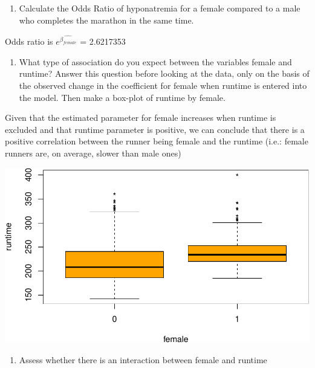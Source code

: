 \documentclass[]{article}
\begin{document}
\begin{enumerate}
\def\labelenumi{\alph{enumi}.}
\setcounter{enumi}{7}
\itemsep1pt\parskip0pt
\item
  Calculate the Odds Ratio of hyponatremia for a female compared to a
  male who completes the marathon in the same time.
\end{enumerate}

Odds ratio is $e^{\hat{\beta_{female}}}$ = 2.6217353

\begin{enumerate}
\def\labelenumi{\roman{enumi}.}
\itemsep1pt\parskip0pt
\item
  What type of association do you expect between the variables female
  and runtime? Answer this question before looking at the data, only on
  the basis of the observed change in the coefficient for female when
  runtime is entered into the model. Then make a box-plot of runtime by
  female.
\end{enumerate}

Given that the estimated parameter for female increases when runtime is
excluded and that runtime parameter is positive, we can conclude that
there is a positive correlation between the runner being female and the
runtime (i.e.: female runners are, on average, slower than male ones)

\begin{center}\includegraphics{HomeworkWeek4_files/figure-latex/unnamed-chunk-5-1} \end{center}

\begin{enumerate}
\def\labelenumi{\alph{enumi}.}
\setcounter{enumi}{9}
\itemsep1pt\parskip0pt
\item
  Assess whether there is an interaction between female and runtime
\end{enumerate}
\end{document}
